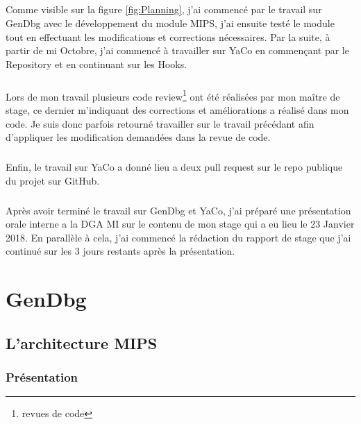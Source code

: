 \documentclass[11pt, book, english, french, standardlists]{upmethodology-document}
\begin{document}
				\paragraph*{}
					Comme visible sur la figure \ref{fig:Planning}, j'ai commencé par le travail sur GenDbg avec le développement du module \acrshort{MIPS}, j'ai ensuite testé le module tout en effectuant les modifications et corrections nécessaires. Par la suite, à partir de mi Octobre, j'ai commencé à travailler sur YaCo en commençant par le Repository et en continuant sur les Hooks.
				\paragraph*{}
					Lors de mon travail plusieurs code review\footnote{revues de code} ont été réalisées par mon maître de stage, ce dernier m'indiquant des corrections et améliorations a réalisé dans mon code. Je suis donc parfois retourné travailler sur le travail précédant afin d'appliquer les modification demandées dans la revue de code.
				\paragraph*{}
					Enfin, le travail sur YaCo a donné lieu a deux pull request\cite{GithubYaCoPR24,GithubYaCoPR30} sur le repo publique du projet sur GitHub\cite{SSTICYaCo}.
				\paragraph*{}
					Après avoir terminé le travail sur GenDbg et YaCo, j'ai préparé une présentation orale interne a la \gls{DGA MI} sur le contenu de mon stage qui a eu lieu le 23 Janvier 2018. En parallèle à cela, j'ai commencé la rédaction du rapport de stage que j'ai continué sur les 3 jours restants après la présentation.
	\chapter{GenDbg}\label{ch:gendbg}
		\section{L'architecture MIPS}
			\subsection{Présentation}
\end{document}

